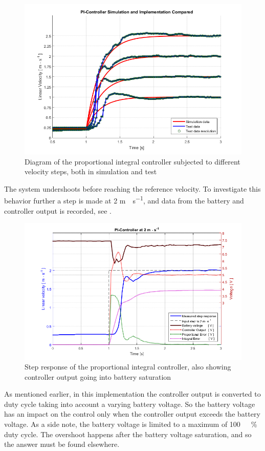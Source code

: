 \begin{figure}[H]
 	\centering
 	\includegraphics[width=.82\textwidth]{figures/multiStepPInew}
 	\caption{Diagram of the proportional integral controller subjected to different velocity steps, both in simulation and test}
 	\label{fig:multiStepPI}
\end{figure}\vspace{-8mm}
The system undershoots before reaching the reference velocity. To investigate this behavior further a step is made at 2 \si{m\cdot s^{-1}}, and data from the battery and controller output is recorded, see .
%
\begin{figure}[H]
 	\centering
 	\includegraphics[width=.82\textwidth]{figures/PInoAntiWindup}
 	\caption{Step response of the proportional integral controller, also showing controller output going into battery saturation}
 	\label{fig:PInoAntiWindup}
\end{figure}\vspace{-5mm}
\newpage
As mentioned earlier, in this implementation the controller output is converted to duty cycle taking into account a varying battery voltage. So the battery voltage has an impact on the control only when the controller output exceeds the battery voltage. As a side note, the battery voltage is limited to a maximum of \si{100 \ \%} duty cycle.
The overshoot happens after the battery voltage saturation, and so the answer must be found elsewhere.

